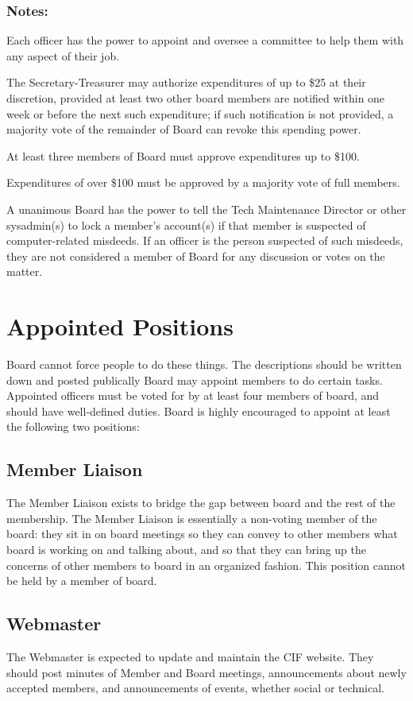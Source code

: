 \documentclass[12pt]{amsart}
\begin{document}
		\subsubsection{Notes:}
Each officer has the power to appoint and oversee a committee to help them with any aspect of their job.

The Secretary-Treasurer may authorize expenditures of up to \$25 at their discretion, provided at least two other board members are notified within one week or before the next such expenditure; if such notification is not provided, a majority vote of the remainder of Board can revoke this spending power.

At least three members of Board must approve expenditures up to \$100.

Expenditures of over \$100 must be approved by a majority vote of full members.

A unanimous Board has the power to tell the Tech Maintenance Director or other sysadmin(s) to lock a member's account(s) if that member is suspected of computer-related misdeeds. If an officer is the person suspected of such misdeeds, they are not considered a member of Board for any discussion or votes on the matter.
\section {Appointed Positions}
{\Large Board cannot force people to do these things. The descriptions should be written down and posted publically}
Board may appoint members to do certain tasks. Appointed officers must be voted for by at least four members of board, and should have well-defined duties. Board is highly encouraged to appoint at least the following two positions:
	\subsection{Member Liaison}
	The Member Liaison exists to bridge the gap between board and the rest of the membership. The Member Liaison is essentially a non-voting member of the board: they sit in on board meetings so they can convey to other members what board is working on and talking about, and so that they can bring up the concerns of other members to board in an organized fashion. This position cannot be held by a member of board.
	\subsection{Webmaster}
	The Webmaster is expected to update and maintain the CIF website. They should post minutes of Member and Board meetings, announcements about newly accepted members, and announcements of events, whether social or technical.
	
\end{document}
